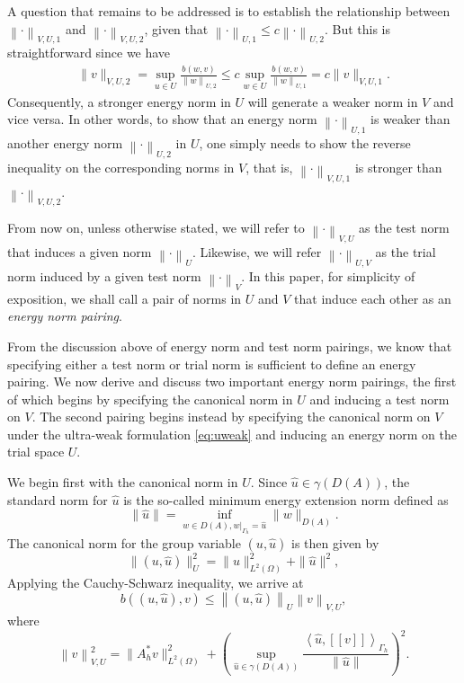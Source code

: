 \documentclass{report}
\newcommand{\eqnlab}[1]{\label{eq:#1}}
\newcommand{\eqnref}[1]{\eqref{eq:#1}}
\newcommand{\nor}[1]{\left\| #1 \right\|}
\newcommand{\LRp}[1]{\left( #1 \right)}
\newcommand{\LRs}[1]{\left[ #1 \right]}
\newcommand{\LRa}[1]{\left\langle #1 \right\rangle}
\newcommand{\jump}[1] {\ensuremath{\LRs{\![#1]\!}}}
\newcommand{\uh}{\widehat{u}}
\renewcommand{\L}{L^2\LRp{\Omega}}
\newcommand{\Gh}{\Gamma_h}
\begin{document}
A question that remains to be addressed is to establish the relationship
between $\nor{\cdot}_{V,U,1}$ and $\nor{\cdot}_{V,U,2}$, given that
$\nor{\cdot}_{U,1} \le c \nor{\cdot}_{U,2}$. But this is
straightforward since we have
\begin{align*}
 \| v \|_{V,U,2} = \sup_{u \in U} \frac{b\left(w,v\right)}{\left\|
  w \right\|_{U,2}} \le c\sup_{w \in U} \frac{b\left(w,v\right)}{\left\| w
  \right\|_{U,1}} = c\| v \|_{V,U,1}.
\end{align*}
Consequently, a stronger energy norm in $U$ will generate a weaker
norm in $V$ and vice versa. In other words, to show that an
energy norm $\nor{\cdot}_{U,1}$ is weaker than another energy norm
$\nor{\cdot}_{U,2}$ in $U$, one simply needs to show the reverse inequality on the
corresponding norms in $V$, that is, $\nor{\cdot}_{V,U,1}$ is stronger
than $\nor{\cdot}_{V,U,2}$.

From now on, unless otherwise stated, we will refer to $\nor{\cdot}_{V,U}$ as the test norm that induces a given norm $\nor{\cdot}_U$. Likewise, we will refer $\nor{\cdot}_{U,V}$ as the trial norm induced by a given test norm $\nor{\cdot}_V$. In this paper, for simplicity of exposition, we shall call a pair of norms in $U$ and $V$ that induce each other as an {\em energy norm pairing}.

From the discussion above of energy norm and test norm pairings, we know that specifying either a test norm or trial norm is sufficient to define an energy pairing. We now derive and discuss two important energy norm pairings, the first of which begins by specifying the canonical norm in $U$ and inducing a test norm on $V$. The second pairing begins instead by specifying the canonical norm on $V$ under the ultra-weak formulation \eqnref{uweak} and inducing an energy norm on the trial space $U$.

We begin first with the canonical norm in $U$. Since $\uh \in \gamma\LRp{D\LRp{A}}$, the standard norm for $\uh$ is
the so-called minimum energy extension norm defined as
\begin{equation}
\eqnlab{MEnorm}
\|\widehat{u}\| = \inf_{w\in D\LRp{A},
  \left.w\right|_{\Gh}=\widehat{u}} \|w\|_{D\LRp{A}}.
\end{equation}
The canonical norm for the group variable $\LRp{u,\uh}$ is then given by
\[
\|\left(u,\widehat{u}\right)\|_U^2 = \|u\|^2_{\L} + \|\widehat{u}\|^2,
\]
Applying the Cauchy-Schwarz inequality, we arrive at
\[
b\LRp{\LRp{u,\uh},v} \le \nor{\LRp{u,\uh}}_U \nor{v}_{V,U},
\]
where
\[
\nor{v}_{V,U}^2 = \|A_h^*v\|_{\L}^2
+\left(\sup_{\widehat{u} \in \gamma\LRp{D\LRp{A}}} \frac{\LRa{ \widehat{u},
  \jump{v} }_{\Gh}}{\|\widehat{u}\|}\right)^2.
\]
\end{document}
